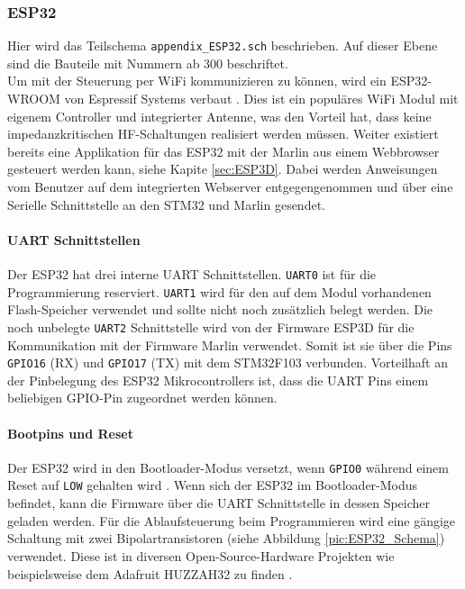 \subsubsection{ESP32}
\label{sec:SchemaESP32}

Hier wird das Teilschema \texttt{appendix\_ESP32.sch} beschrieben. Auf dieser Ebene sind die Bauteile mit Nummern ab 300 beschriftet.\\

Um mit der Steuerung per WiFi kommunizieren zu können, wird ein ESP32-WROOM von Espressif Systems verbaut \cite{ESP32Wroom}. Dies ist ein populäres WiFi Modul mit eigenem Controller und integrierter Antenne, was den Vorteil hat, dass keine impedanzkritischen HF-Schaltungen realisiert werden müssen. Weiter existiert bereits eine Applikation für das ESP32 mit der Marlin aus einem Webbrowser gesteuert werden kann, siehe Kapite \ref{sec:ESP3D}. Dabei werden Anweisungen vom Benutzer auf dem integrierten Webserver entgegengenommen und über eine Serielle Schnittstelle an den STM32 und Marlin gesendet. 

\paragraph{UART Schnittstellen}
Der ESP32 hat drei interne UART Schnittstellen. \texttt{UART0} ist für die Programmierung reserviert. 
\texttt{UART1} wird für den auf dem Modul vorhandenen Flash-Speicher verwendet und sollte nicht noch zusätzlich belegt werden.
Die noch unbelegte \texttt{UART2} Schnittstelle wird von der Firmware ESP3D für die Kommunikation mit der Firmware Marlin verwendet. Somit ist sie über die Pins \texttt{GPIO16} (RX) und \texttt{GPIO17} (TX) mit dem STM32F103 verbunden.
Vorteilhaft an der Pinbelegung des ESP32 Mikrocontrollers ist, dass die UART Pins einem beliebigen GPIO-Pin zugeordnet werden können.

\paragraph{Bootpins und Reset}
Der ESP32 wird in den Bootloader-Modus versetzt, wenn \texttt{GPIO0} während einem Reset auf \texttt{LOW} gehalten wird \cite{ESP32BootMode}.
Wenn sich der ESP32 im Bootloader-Modus befindet, kann die Firmware über die UART Schnittstelle in dessen Speicher geladen werden.
Für die Ablaufsteuerung beim Programmieren wird eine gängige Schaltung mit zwei Bipolartransistoren (siehe Abbildung \ref{pic:ESP32_Schema}) verwendet. Diese ist in diversen Open-Source-Hardware Projekten wie beispielsweise dem Adafruit HUZZAH32 zu finden \cite{AdafruitHuzzah32}.\\


